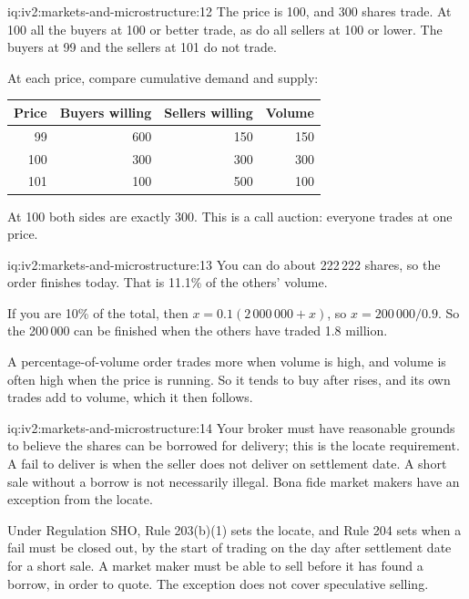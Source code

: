 \begin{solution}{iq:iv2:markets-and-microstructure:12}
The price is 100, and 300 shares trade. At 100 all the buyers at 100 or better trade, as do all sellers at 100 or lower. The buyers at 99 and the sellers at 101 do not trade.

At each price, compare cumulative demand and supply:
\begin{center}\small
\begin{tabular}{@{}rrrr@{}}
Price & Buyers willing & Sellers willing & Volume \\ \hline
99 & 600 & 150 & 150 \\
100 & 300 & 300 & 300 \\
101 & 100 & 500 & 100
\end{tabular}
\end{center}
At 100 both sides are exactly 300. This is a call auction: everyone trades at one price.

\end{solution}

\begin{solution}{iq:iv2:markets-and-microstructure:13}
You can do about 222\,222 shares, so the order finishes today. That is 11.1\% of the others' volume.

If you are 10\% of the total, then $x = 0.1(2\,000\,000 + x)$, so $x = 200\,000/0.9$. So the 200\,000 can be finished when the others have traded 1.8 million.

A percentage-of-volume order trades more when volume is high, and volume is often high when the price is running. So it tends to buy after rises, and its own trades add to volume, which it then follows.

\end{solution}

\begin{solution}{iq:iv2:markets-and-microstructure:14}
Your broker must have reasonable grounds to believe the shares can be borrowed for delivery; this is the locate requirement. A fail to deliver is when the seller does not deliver on settlement date. A short sale without a borrow is not necessarily illegal. Bona fide market makers have an exception from the locate.

Under Regulation SHO, Rule 203(b)(1) sets the locate, and Rule 204 sets when a fail must be closed out, by the start of trading on the day after settlement date for a short sale. A market maker must be able to sell before it has found a borrow, in order to quote. The exception does not cover speculative selling.

\end{solution}

